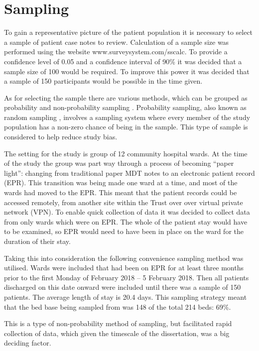 \documentclass
[
	12pt,
	a4paper,
	oneside,
]{report}
\begin{document}
\section{Sampling}

To gain a representative picture of the patient population it is necessary
to select a sample of patient case notes to review. Calculation of a sample size 
was performed using the website www.surveysystem.com/sscalc. To provide a confidence
level of 0.05 and a confidence interval of 90\% it was decided that a sample 
size of 100 would be required. To improve this power it was decided that a sample
of 150 participants would be possible in the time given.

As for selecting the sample there are various methods, which can be grouped as 
probability and non-probability sampling \parencite{parahoo:14}. Probability 
sampling, also known as random sampling \parencite{biggam:15}, involves a 
sampling system where every
member of the study population has a non-zero chance of being in the sample.
This type of sample is considered to help reduce study bias.

The setting for the study is group of 12 
community hospital wards. At the time of the study the group was part way 
through a process of becoming ``paper light'': changing from traditional paper
MDT notes to an electronic patient record (EPR). This transition was being made
one ward at a time, and most of the wards had moved to the EPR. This meant that 
the patient records could be accessed remotely, from another site within the 
Trust over over virtual private network (VPN). To enable quick collection of data
it was decided to collect data from only wards which were on EPR. The whole of the 
patient stay would have to be examined, so EPR would need to have been in place
on the ward for the duration of their stay.

Taking this into consideration the following convenience sampling method was 
utilised. Wards were included that had been on EPR for at least three months
prior to the first Monday of February 2018 -- 5 February 2018. Then all patients
discharged on this date onward were included until there was a sample of 150
patients. The average length of stay is 20.4 days. This sampling strategy 
meant that the bed base being sampled from was 148 of the total 214 beds: 69\%.

This is a type of non-probability method of sampling, but facilitated rapid
collection of data, which given the timescale of the dissertation, was a big
deciding factor.
\end{document}
